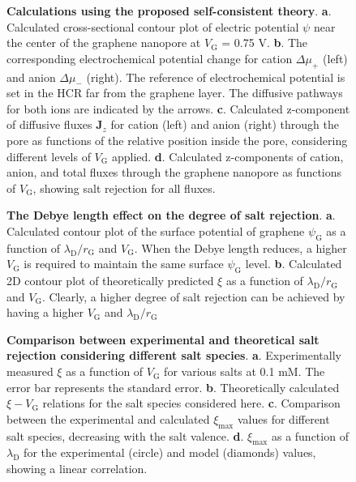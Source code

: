 \begin{figure}[H]
  \centering
  \caption{\textbf{Calculations using the proposed self-consistent
      theory}. \textbf{a}. Calculated cross-sectional contour plot of
    electric potential $\psi$ near the center of the graphene
    nanopore at $V_{\mathrm{G}}$ = 0.75 V. \textbf{b}. The
    corresponding electrochemical potential change for cation
    $\Delta \mu_{+}$ (left) and anion $\Delta \mu_{-}$ (right). The
    reference of electrochemical potential is set in the HCR far from
    the graphene layer. The diffusive pathways for both ions are
    indicated by the arrows. \textbf{c}. Calculated z-component of
    diffusive fluxes $\symbf{J}_{z}$ for cation (left) and anion
    (right) through the pore as functions of the relative position
    inside the pore, considering different levels of $V_{\mathrm{G}}$
    applied. \textbf{d}. Calculated z-components of cation, anion, and
    total fluxes through the graphene nanopore as functions of
    $V_{\mathrm{G}}$, showing salt rejection for all fluxes.}
  \label{fig:np-4}
\end{figure}

\begin{figure}[H]
  \centering
  \caption{\textbf{The Debye length effect on the degree of salt
      rejection}. \textbf{a}. Calculated contour plot of the surface
    potential of graphene $\psi_{\mathrm{G}}$ as a function of
    $\lambda_{\mathrm{D}}/r_{\mathrm{G}}$ and $V_{\mathrm{G}}$. When
    the Debye length reduces, a higher $V_{\mathrm{G}}$ is required to
    maintain the same surface $\psi_{\mathrm{G}}$
    level. \textbf{b}. Calculated 2D contour plot of theoretically
    predicted $\xi$ as a function of
    $\lambda_{\mathrm{D}}/r_{\mathrm{G}}$ and
    $V_{\mathrm{G}}$. Clearly, a higher degree of salt rejection can
    be achieved by having a higher $V_{\mathrm{G}}$ and
    $\lambda_{\mathrm{D}}/r_{\mathrm{G}}$}
  \label{fig:np-5}
\end{figure}

\begin{figure}[H]
  \centering
  \caption{\textbf{Comparison between experimental and theoretical
      salt rejection considering different salt
      species}. \textbf{a}. Experimentally measured $\xi$ as a
    function of $V_{\mathrm{G}}$ for various salts at 0.1 mM. The
    error bar represents the standard error. \textbf{b}. Theoretically
    calculated $\xi-V_{\mathrm{G}}$ relations for the salt species
    considered here. \textbf{c}. Comparison between the experimental
    and calculated $\xi_{\mathrm{max}}$ values for different salt
    species, decreasing with the salt
    valence. \textbf{d}. $\xi_{\mathrm{max}}$ as a function of
    $\lambda_{\mathrm{D}}$ for the experimental (circle) and model
    (diamonds) values, showing a linear correlation.}
  \label{fig:np-6}
\end{figure}







